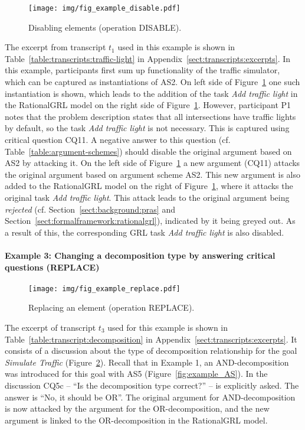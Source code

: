 \begin{figure}[b]
\centering
\texttt{[image: img/fig\_example\_disable.pdf]}
\caption{Disabling elements (operation \textsf{DISABLE)}.}
\label{fig:example_disable}
\end{figure}

The excerpt from transcript $t_1$ used in this example is shown in Table~\ref{table:transcripts:traffic-light} in Appendix~\ref{sect:transcripts:excerpts}. In this example, participants first sum up functionality of the traffic simulator, which can be captured as instantiations of AS2. On left side of Figure~\ref{fig:example_disable} one such instantiation is shown, which leads to the addition of the task \emph{Add traffic light} in the RationalGRL model on the right side of Figure~\ref{fig:example_disable}. However, participant P1 notes that the problem description states that all intersections have traffic lights by default, so the task \emph{Add traffic light} is not necessary. This is captured using critical question CQ11. A negative answer to this question (cf. Table~\ref{table:argument-schemes}) should disable the original argument based on AS2 by attacking it. On the left side of Figure~\ref{fig:example_disable} a new argument (CQ11) attacks the original argument based on argument scheme AS2. This new argument is also added to the RationalGRL model on the right of Figure~\ref{fig:example_disable}, where it attacks the original task \emph{Add traffic light}. This attack leads to the original argument being \emph{rejected} (cf. Section~\ref{sect:background:pras} and Section~\ref{sect:formalframework:rationalgrl}), indicated by it being greyed out. As a result of this, the corresponding GRL task \emph{Add traffic light} is also disabled. 

\paragraph{Example 3: Changing a decomposition type by answering critical questions (\textsf{REPLACE})} 

\begin{figure}[t]
\centering
\texttt{[image: img/fig\_example\_replace.pdf]}
\caption{Replacing an element (operation \textsf{REPLACE)}.}
\label{fig:examples:decomposition}
\end{figure}

The excerpt of transcript $t_3$ used for this example is shown in Table~\ref{table:transcript:decomposition} in Appendix~\ref{sect:transcripts:excerpts}. It consists of a discussion about the type of decomposition relationship for the goal \emph{Simulate Traffic} (Figure~\ref{fig:examples:decomposition}). Recall that in Example 1, an AND-decomposition was introduced for this goal with AS5 (Figure~\ref{fig:example_AS}). In the discussion CQ5c -- ``Is the decomposition type correct?'' -- is explicitly asked. The answer is ``No, it should be OR''. The original argument for AND-decomposition is now attacked  by the argument for the OR-decomposition, and the new argument is linked to the OR-decomposition in the RationalGRL model. 

